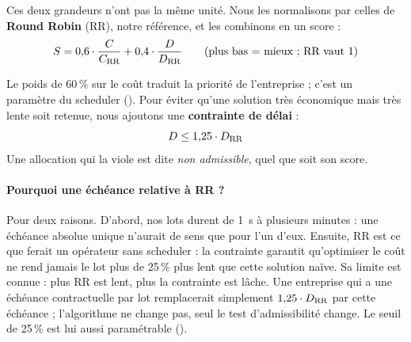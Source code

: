 Ces deux grandeurs n'ont pas la même unité. Nous les normalisons par celles de
\textbf{Round Robin} (RR), notre référence, et les combinons en un score :
\begin{equation}
  S = 0{,}6 \cdot \frac{C}{C_{\mathrm{RR}}} + 0{,}4 \cdot \frac{D}{D_{\mathrm{RR}}}
  \qquad \text{(plus bas = mieux ; RR vaut 1)}
  \label{eq:score}
\end{equation}

Le poids de 60\,\% sur le coût traduit la priorité de l'entreprise ; c'est un
paramètre du scheduler (). Pour éviter qu'une solution très
économique mais très lente soit retenue, nous ajoutons une \textbf{contrainte de
délai} :
\begin{equation}
  D \le 1{,}25 \cdot D_{\mathrm{RR}}
  \label{eq:deadline}
\end{equation}
Une allocation qui la viole est dite \emph{non admissible}, quel que soit son
score.

\paragraph{Pourquoi une échéance relative à RR ?} Pour deux raisons. D'abord, nos
lots durent de 1~s à plusieurs minutes : une échéance absolue unique n'aurait de
sens que pour l'un d'eux. Ensuite, RR est ce que ferait un opérateur sans
scheduler : la contrainte garantit qu'optimiser le coût ne rend jamais le lot plus
de 25\,\% plus lent que cette solution naïve. Sa limite est connue : plus RR est
lent, plus la contrainte est lâche. Une entreprise qui a une échéance
contractuelle par lot remplacerait simplement $1{,}25 \cdot D_{\mathrm{RR}}$ par cette
échéance ; l'algorithme ne change pas, seul le test d'admissibilité change. Le
seuil de 25\,\% est lui aussi paramétrable ().
